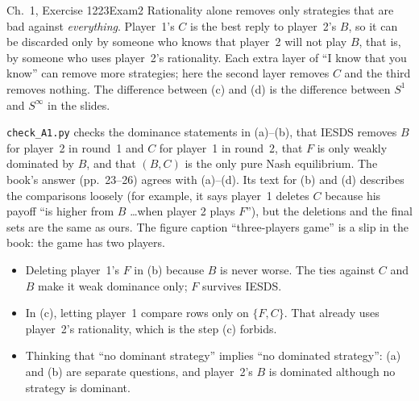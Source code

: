 \begin{exsol}{\MG{} Ch.~1, Exercise 12}{23}{Exam}{2}
\interp Rationality alone removes only strategies that are bad against \emph{everything}.
Player~1's $C$ is the best reply to player~2's $B$, so it can be discarded only by someone who knows
that player~2 will not play $B$, that is, by someone who uses player~2's rationality. Each extra
layer of ``I know that you know'' can remove more strategies; here the second layer removes $C$
and the third removes nothing. The difference between (c) and (d) is the difference between
$S^1$ and $S^\infty$ in the slides.

\verify \texttt{check\_A1.py} checks the dominance statements in (a)--(b), that IESDS removes $B$
for player~2 in round~1 and $C$ for player~1 in round~2, that $F$ is only weakly dominated by $B$,
and that $(B,C)$ is the only pure Nash equilibrium. The book's answer (pp.~23--26) agrees with
(a)--(d). Its text for (b) and (d) describes the comparisons loosely (for example, it says
player~1 deletes $C$ because his payoff ``is higher from $B$ \dots when player 2 plays $F$''), but
the deletions and the final sets are the same as ours. The figure caption ``three-players game''
is a slip in the book: the game has two players.

\mistakes
\begin{itemize}
  \item Deleting player~1's $F$ in (b) because $B$ is never worse. The ties against $C$ and $B$
  make it weak dominance only; $F$ survives IESDS.
  \item In (c), letting player~1 compare rows only on $\{F, C\}$. That already uses player~2's
  rationality, which is the step (c) forbids.
  \item Thinking that ``no dominant strategy'' implies ``no dominated strategy'': (a) and (b) are
  separate questions, and player~2's $B$ is dominated although no strategy is dominant.
\end{itemize}

\end{exsol}
